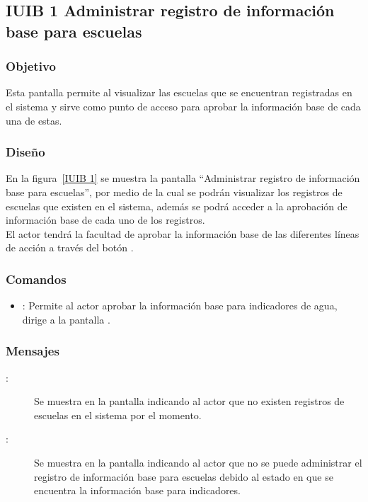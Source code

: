 \subsection{IUIB 1 Administrar registro de información base para escuelas}

\subsubsection{Objetivo}


    Esta pantalla permite al  visualizar las escuelas que se encuentran registradas en el sistema y sirve como punto de acceso para aprobar la información base de cada una de estas.
    
\subsubsection{Diseño}

    En la figura~\ref{IUIB 1} se muestra la pantalla ``Administrar registro de información base para escuelas'', por medio de la cual se podrán visualizar los registros de escuelas que existen en el sistema, además se podrá  acceder a la aprobación de información base de cada uno de los registros.\\
    
    El actor tendrá la facultad de aprobar la información base de las diferentes líneas de acción  a través del botón \botReg.  



\subsubsection{Comandos}
    \begin{itemize}
	\item {}: Permite al actor aprobar la información base para indicadores de agua, dirige a la pantalla . 
    \end{itemize}

\subsubsection{Mensajes}

    \begin{description}
	\item[:] Se muestra en la pantalla  indicando al actor que no existen registros de escuelas en el sistema por el momento.
	\item [:] Se muestra en la pantalla  indicando al actor que no se puede administrar el registro de información base para escuelas debido al estado en que se encuentra la información base para indicadores.
    \end{description}
